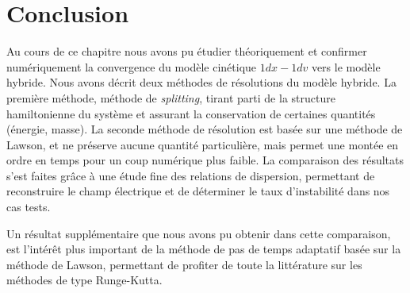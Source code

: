 
\section{Conclusion}

Au cours de ce chapitre nous avons pu étudier théoriquement et confirmer numériquement la convergence du modèle cinétique $1dx-1dv$ vers le modèle hybride. Nous avons décrit deux méthodes de résolutions du modèle hybride. La première méthode, méthode de \emph{splitting}, tirant parti de la structure hamiltonienne du système et assurant la conservation de certaines quantités (énergie, masse). La seconde méthode de résolution est basée sur une méthode de Lawson, et ne préserve aucune quantité particulière, mais permet une montée en ordre en temps pour un coup numérique plus faible. La comparaison des résultats s'est faites grâce à une étude fine des relations de dispersion, permettant de reconstruire le champ électrique et de déterminer le taux d'instabilité dans nos cas tests.

Un résultat supplémentaire que nous avons pu obtenir dans cette comparaison, est l'intérêt plus important de la méthode de pas de temps adaptatif basée sur la méthode de Lawson, permettant de profiter de toute la littérature sur les méthodes de type Runge-Kutta.

